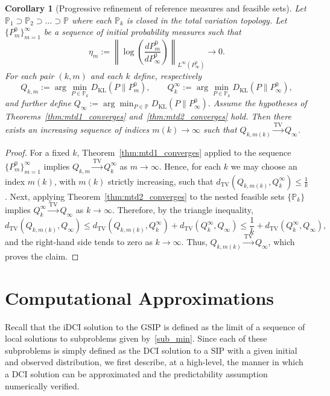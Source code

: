\documentclass{article}
\newtheorem{corollary}{Corollary}[section]
\newcommand{\p}{\mathbb{P}}
\begin{document}
\begin{corollary}[Progressive refinement of reference measures and feasible sets]\label{cor:feasible_sets}
Let $\p_{1} \supset \p_{2} \supset \dots \supset \p$
where each $\p_k$ is closed in the total variation topology.
Let
$\{P_m^0\}_{m=1}^{\infty}$ be a sequence of initial probability measures
such that
\[
\eta_m
:=
\left\|
\log\left(
\frac{dP_m^0}{dP_\infty^0}
\right)
\right\|_{L^\infty(P_\infty^0)}
\longrightarrow 0.
\]
For each pair $(k,m)$ and each $k$ define, respectively
\[
Q_{k,m}
:=
\arg\min_{P\in\p_k} D_{\mathrm{KL}}(P\|P_m^0), \qquad
Q_k^\infty
:=
\arg\min_{P\in\p_k} D_{\mathrm{KL}}(P\|P_\infty^0),
\]
and further define $
Q_\infty
:=
\arg\min_{P\in\p} D_{\mathrm{KL}}(P\|P_\infty^0).
$
Assume the hypotheses of Theorems~\ref{thm:mtd1_converges} and~\ref{thm:mtd2_converges} hold. Then there exists an increasing sequence of indices $m(k)\to\infty$ such that $Q_{k,m(k)} \xrightarrow{\mathrm{TV}} Q_\infty$.
\end{corollary}

\begin{proof}
For a fixed $k$,  Theorem~\ref{thm:mtd1_converges} applied to the sequence $\{P_m^0\}_{m=1}^\infty$ implies $Q_{k,m} \xrightarrow{\mathrm{TV}} Q_k^\infty$ as $m\to\infty$.
Hence, for each $k$ we may choose an index $m(k)$, with $m(k)$ strictly increasing, such that
$d_{\mathrm{TV}}(Q_{k,m(k)},Q_k^\infty) \le \frac{1}{k}$.
Next, applying Theorem~\ref{thm:mtd2_converges} to the nested feasible sets $\{\p_k\}$ implies $Q_k^\infty \xrightarrow{\mathrm{TV}} Q_\infty$ as $k\to\infty$.
Therefore, by the triangle inequality,
\[
d_{\mathrm{TV}}(Q_{k,m(k)},Q_\infty)
\le
d_{\mathrm{TV}}(Q_{k,m(k)},Q_k^\infty)
+
d_{\mathrm{TV}}(Q_k^\infty,Q_\infty)
\le
\frac{1}{k}
+
d_{\mathrm{TV}}(Q_k^\infty,Q_\infty),
\]
and the right-hand side tends to zero as $k\to\infty$.
Thus, $Q_{k,m(k)} \xrightarrow{\mathrm{TV}} Q_\infty$,
which proves the claim.
\end{proof}

\section{Computational Approximations}\label{sec:comp_approx}

Recall that the iDCI solution to the GSIP is defined as the limit of a sequence of local solutions to subproblems given by~\eqref{sub_min}.
Since each of these subproblems is simply defined as the DCI solution to a SIP with a given initial and observed distribution, we first describe, at a high-level, the manner in which a DCI solution can be approximated and the predictability assumption numerically verified.
\end{document}
